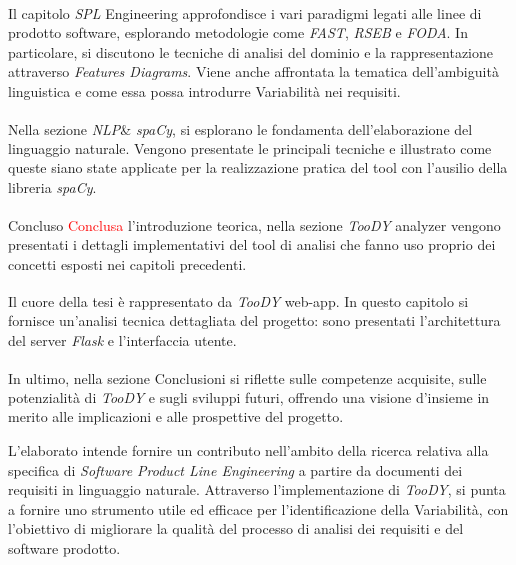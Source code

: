 \documentclass[12pt]{report}
\newcommand{\torevise}[1]{\textcolor{red}{#1}}
\newcommand{\myref}[1]{\textsuperscript{\hyperref[#1]{\ding{70}}}}
\newcommand{\toody}{\textsl{TooDY}\xspace}
\newcommand{\flask}{\textsl{Flask}\xspace}
\newcommand{\spacy}{\textsl{spaCy}\xspace}
\newcommand{\spl}{\textsl{SPL}\xspace}
\newcommand{\nlp}{\textsl{NLP}\xspace}
\begin{document}
\begin{mdframed}
\small
Il capitolo \textsf{\spl Engineering}\myref{ch:sple} approfondisce i vari paradigmi legati alle linee di prodotto software, esplorando metodologie come \textit{FAST}, \textit{RSEB} e \textit{FODA}. In particolare, si discutono le tecniche di analisi del dominio e la rappresentazione attraverso \textit{Features Diagrams}. Viene anche affrontata la tematica dell’ambiguità linguistica e come essa possa introdurre Variabilità nei requisiti.

\vspace{0.25cm}

Nella sezione \textsf{\nlp \& \spacy}\myref{ch:nlp}, si esplorano le fondamenta dell'elaborazione del linguaggio naturale. Vengono presentate le principali tecniche e illustrato come queste siano state applicate per la realizzazione pratica del tool con l'ausilio della libreria \spacy.

\vspace{0.25cm}

Concluso \torevise{Conclusa} l'introduzione teorica, nella sezione \textsf{\toody analyzer}\myref{ch:parser} vengono presentati i dettagli implementativi del tool di analisi che fanno uso proprio dei concetti esposti nei capitoli precedenti.

\vspace{0.25cm}

Il cuore della tesi è rappresentato da \textsf{\toody web-app}\myref{ch:architettura}. In questo capitolo si fornisce un'analisi tecnica dettagliata del progetto: sono presentati l'architettura del server \flask e l’interfaccia utente.

\vspace{0.25cm}

In ultimo, nella sezione \textsf{Conclusioni}\myref{ch:conclusioni} si riflette sulle competenze acquisite, sulle potenzialità di \toody e sugli sviluppi futuri, offrendo una visione d'insieme in merito alle implicazioni e alle prospettive del progetto.
\end{mdframed}


\noindent L’elaborato intende fornire un contributo nell’ambito della ricerca relativa alla specifica di \textit{Software Product Line Engineering} a partire da documenti dei requisiti in linguaggio naturale. Attraverso l’implementazione di \toody, si punta a fornire uno strumento utile ed efficace per l’identificazione della Variabilità, con l’obiettivo di migliorare la qualità del processo di analisi dei requisiti e del software prodotto.
\end{document}

